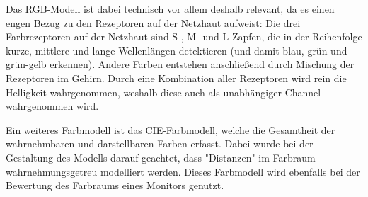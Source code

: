				Das RGB-Modell ist dabei technisch vor allem deshalb relevant, da es einen engen Bezug zu den Rezeptoren auf der Netzhaut aufweist: Die drei Farbrezeptoren auf der Netzhaut sind S-, M- und L-Zapfen, die in der Reihenfolge kurze, mittlere und lange Wellenlängen detektieren (und damit blau, grün und grün-gelb erkennen). Andere Farben entstehen anschließend durch Mischung der Rezeptoren im Gehirn. Durch eine Kombination aller Rezeptoren wird rein die Helligkeit wahrgenommen, weshalb diese auch als unabhängiger Channel wahrgenommen wird.

				Ein weiteres Farbmodell ist das CIE-Farbmodell, welche die Gesamtheit der wahrnehmbaren und darstellbaren Farben erfasst. Dabei wurde bei der Gestaltung des Modells darauf geachtet, dass "Distanzen" im Farbraum wahrnehmungsgetreu modelliert werden. Dieses Farbmodell wird ebenfalls bei der Bewertung des Farbraums eines Monitors genutzt.


